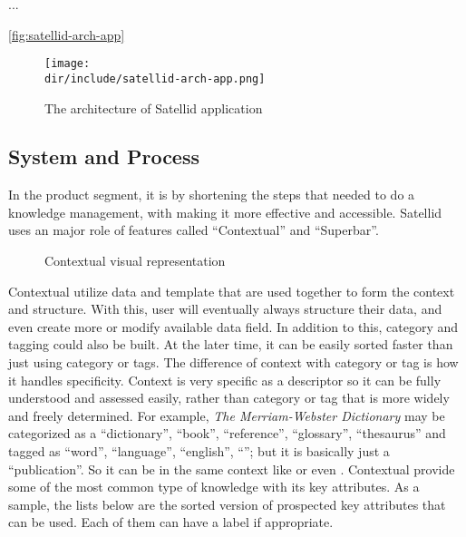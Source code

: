 ...

\autoref{fig:satellid-arch-app}

\begin{figure}[htbp]
    \centering
    \texttt{[image: \\dir/include/satellid-arch-app.png]}
    \caption[Satellid Application Architecture]{The architecture of Satellid application}
    \label{fig:satellid-arch-app}
\end{figure}

\subsection{System and Process}

In the product segment, it is by shortening the steps that needed to do a knowledge management, with making it more effective and accessible. Satellid uses an major role of features called ``Contextual'' and ``Superbar''.

\begin{figure}[htb]
    \centering
    \caption{Contextual visual representation}
    \label{fig:background:contextual}
\end{figure}

Contextual utilize data and template that are used together to form the context and structure.
With this, user will eventually always structure their data, and even create more or modify available data field.
In addition to this, category and tagging could also be built.
At the later time, it can be easily sorted faster than just using category or tags.
The difference of context with category or tag is how it handles specificity.
Context is very specific as a descriptor so it can be fully understood and assessed easily, rather than category or tag that is more widely and freely determined.
For example, \textit{The Merriam-Webster Dictionary} may be categorized as a ``dictionary'', ``book'', ``reference'', ``glossary'', ``thesaurus'' and tagged as ``word'', ``language'', ``english'', ``''; but it is basically just a ``publication''.
So it can be in the same context like  or even .
Contextual provide some of the most common type of knowledge with its key attributes.
As a sample, the lists below are the sorted version of prospected key attributes that can be used.
Each of them can have a label if appropriate.

